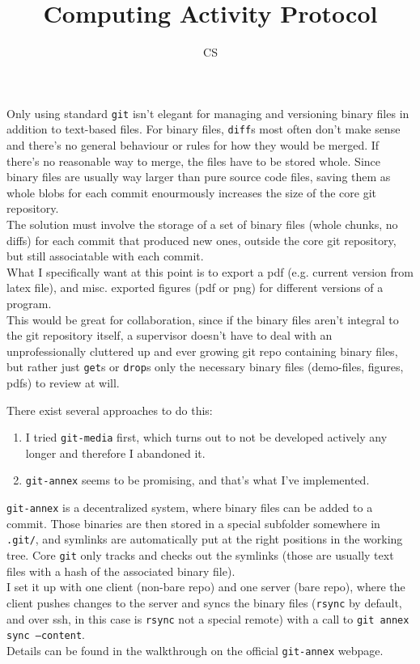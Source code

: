 \documentclass[12pt]{article}
\newenvironment{solution}[2][Solution]{\begin{trivlist}
\item[\hskip \labelsep {\bfseries #1}]}{\end{trivlist}}
\newenvironment{problem}[2][Problem]{\begin{trivlist}
\item[\hskip \labelsep {\bfseries #1}\hskip \labelsep {\bfseries #2.}]}{\end{trivlist}}
\begin{document}
\title{\vspace{-2cm}Computing Activity Protocol}
\author{CS}
\maketitle

\begin{problem}{}
    Only using standard \texttt{git} isn't elegant for managing and versioning binary files in addition to text-based files. For binary files, \texttt{diff}s most often don't make sense and there's no general behaviour or rules for how they would be merged. If there's no reasonable way to merge, the files have to be stored whole. Since binary files are usually way larger than pure source code files, saving them as whole blobs for each commit enourmously increases the size of the core git repository. \\ The solution must involve the storage of a set of binary files (whole chunks, no diffs) for each commit that produced new ones, outside the core git repository, but still associatable with each commit. \\
What I specifically want at this point is to export a pdf (e.g. current version from latex file), and misc. exported figures (pdf or png) for different versions of a program. \\ This would be great for collaboration, since if the binary files aren't integral to the git repository itself, a supervisor doesn't have to deal with an unprofessionally cluttered up and ever growing git repo containing binary files, but rather just \texttt{get}s or \texttt{drop}s only the necessary binary files (demo-files, figures, pdfs) to review at will. 
\end{problem}

\begin{solution}{}
There exist several approaches to do this: 
    \begin{enumerate} 
    \item I tried \texttt{git-media} first, which turns out to not be developed actively any longer and therefore I abandoned it.
    \item \texttt{git-annex} seems to be promising, and that's what I've implemented. 
\end{enumerate}

    \texttt{git-annex} is a decentralized system, where binary files can be added to a commit. Those binaries are then stored in a special subfolder somewhere in \texttt{.git/}, and symlinks are automatically put at the right positions in the working tree. Core \texttt{git} only tracks and checks out the symlinks (those are usually text files with a hash of the associated binary file). \\
    I set it up with one client (non-bare repo) and one server (bare repo), where the client pushes changes to the server and syncs the binary files (\texttt{rsync} by default, and over ssh, in this case is \texttt{rsync} not a special remote) with a call to \texttt{git annex sync --content}. \\
  Details can be found in the walkthrough on the official \texttt{git-annex} webpage.
\end{solution}
\end{document}

